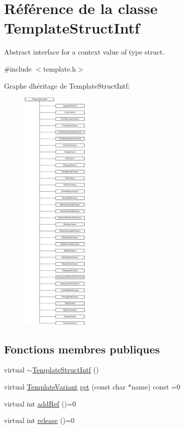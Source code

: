 \hypertarget{class_template_struct_intf}{}\section{Référence de la classe Template\+Struct\+Intf}
\label{class_template_struct_intf}


Abstract interface for a context value of type struct.  




{\ttfamily \#include $<$template.\+h$>$}

Graphe d\textquotesingle{}héritage de Template\+Struct\+Intf\+:\begin{figure}[H]
\begin{center}
\leavevmode
\includegraphics[height=12.000000cm]{class_template_struct_intf}
\end{center}
\end{figure}
\subsection*{Fonctions membres publiques}
\begin{DoxyCompactItemize}
\item 
virtual \hyperlink{class_template_struct_intf_a54ce5b2065da3e862da316db259cb49d}{$\sim$\+Template\+Struct\+Intf} ()
\item 
virtual \hyperlink{class_template_variant}{Template\+Variant} \hyperlink{class_template_struct_intf_afd77683d121b5b6aebc8b6648c46ee20}{get} (const char $\ast$name) const  =0
\item 
virtual int \hyperlink{class_template_struct_intf_a05fe97ad47633beb326f69686faed581}{add\+Ref} ()=0
\item 
virtual int \hyperlink{class_template_struct_intf_a3dce7dd29d3f66a8080b40578e8a5045}{release} ()=0
\end{DoxyCompactItemize}


